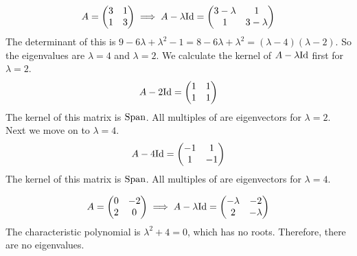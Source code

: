 \documentclass[fleqn]{report}
\begin{document}
\begin{example}
\begin{equation*}
A = \left( \begin{matrix}
3 & 1 \\ 1 & 3 
\end{matrix} \right)
\implies A - \lambda \mathrm{Id} = 
\left( \begin{matrix}
3-\lambda & 1 \\ 1 & 3 - \lambda
\end{matrix} \right)
\end{equation*}
The determinant of this is $9 - 6\lambda + \lambda^2 - 1 =
8-6\lambda + \lambda^2 = (\lambda-4)(\lambda-2)$. So the
eigenvalues are $\lambda = 4$ and $\lambda = 2$. We calculate
the kernel of $A - \lambda \mathrm{Id}$ first for $\lambda = 2$.
\begin{equation*}
A - 2 \mathrm{Id} = \left( \begin{matrix}
1 & 1 \\ 1 & 1
\end{matrix} \right)
\end{equation*}
The kernel of this matrix is $\mathrm{Span}$. All multiples of
 are eigenvectors for
$\lambda = 2$. Next we move on to $\lambda = 4$.
\begin{equation*}
A - 4 \mathrm{Id} = \left( \begin{matrix}
-1 & 1 \\ 1 & - 1
\end{matrix} \right)
\end{equation*}
The kernel of this matrix is $\mathrm{Span}$. All multiples of
 are eigenvectors for
$\lambda = 4$.
\end{example}

\begin{example}
\begin{equation*}
A = \left( \begin{matrix}
0 & -2 \\ 2 & 0 
\end{matrix} \right)
\implies A - \lambda \mathrm{Id} = 
\left( \begin{matrix}
-\lambda & -2 \\ 2 & -\lambda
\end{matrix} \right)
\end{equation*}
The characteristic polynomial is $\lambda^2 + 4 = 0$, which has
no roots. Therefore, there are no eigenvalues.
\end{example}
\end{document}

